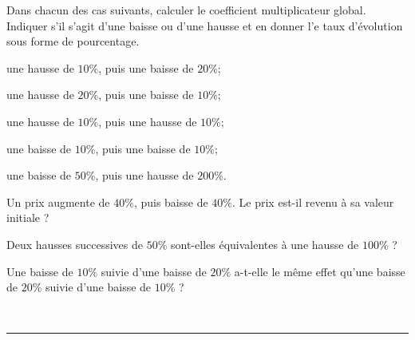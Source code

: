 \documentclass[a4paper,10pt]{book}        %
\begin{document}
\begin{minipage}[c]{0.48\linewidth}
	\exercice{}
	
	Dans chacun des cas suivants, calculer le coefficient multiplicateur global. Indiquer s'il s'agit d'une baisse ou d'une hausse et en donner l'e taux d'évolution sous forme de pourcentage.
	\begin{enumMet}
		\item une hausse de $10 \%$, puis une baisse de $20 \%$;
		\item une hausse de $20 \%$, puis une baisse de $10 \%$;
		\item une hausse de $10 \%$, puis une hausse de $10 \%$;
		\item une baisse de $10 \%$, puis une baisse de $10 \%$;
		\item une baisse de $50 \%$, puis une hausse de $200 \%$.
	\end{enumMet}
\end{minipage} \hfill
\begin{minipage}[c]{0.48\linewidth}
	\exercice{}
	
	\begin{enumMet}
		\item Un prix augmente de $40 \%$, puis baisse de $40 \%$. Le prix est-il revenu à sa valeur initiale ?
		\item Deux hausses successives de $50 \%$ sont-elles équivalentes à une hausse de $100 \%$ ?
		\item Une baisse de $10 \%$ suivie d'une baisse de $20 \%$ a-t-elle le même effet qu'une baisse de $20 \%$ suivie d'une baisse de $10 \%$ ?
	\end{enumMet}
\end{minipage}

\ \\
\mbox{}\hfill\rule{0.8\linewidth}{1pt}\hfill\mbox{}


\exercice{}
\end{document}
